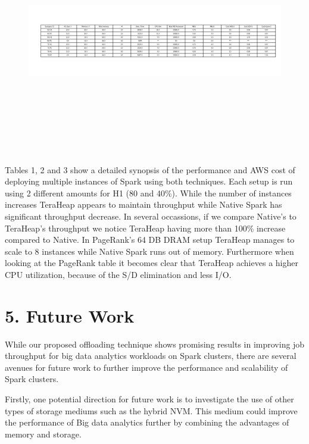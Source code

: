 \documentclass[twocolumn,10pt]{asme2e}
\begin{document}
\begin{figure}[h!]
        \includegraphics[width=20cm,height=10cm]{cc_table.png}
\end{figure}


Tables 1, 2 and 3 show a detailed synopsis of the performance and AWS cost of deploying multiple instances of Spark using both techniques. Each setup is run using 2 different amounts for H1 (80 and 40\%). While the number of instances increases TeraHeap appears to maintain throughput while Native Spark has significant throughput decrease. In several occassions, if we compare Native's to TeraHeap's throughput we notice TeraHeap having more than 100\% increase compared to Native. In PageRank's 64 DB DRAM setup TeraHeap manages to scale to 8 instances while Native Spark runs out of memory. Furthermore when looking at the PageRank table it becomes clear that TeraHeap achieves a higher CPU utilization, because of the S/D elimination and less I/O. 

\section*{5. Future Work}

While our proposed offloading technique shows promising results in improving job throughput for big data analytics workloads on Spark clusters, there are several avenues for future work to further improve the performance and scalability of Spark clusters. 

Firstly, one potential direction for future work is to investigate the use of other types of storage mediums such as the hybrid NVM. This medium could improve the performance of Big data analytics further by combining the advantages of memory and storage.
\end{document}

